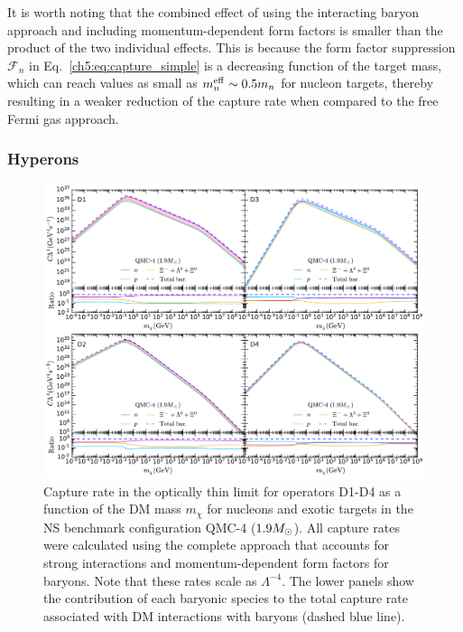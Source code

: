It is worth noting that the combined effect of using the interacting baryon approach and including momentum-dependent form factors is smaller than the product of the two individual effects. This is because the form factor suppression $\mathcal{F}_n$ in Eq.~\ref{ch5:eq:capture_simple} is a decreasing function of the target mass, which can reach values as small as $m_n^{\rm eff}\sim0.5m_n$ for nucleon targets, thereby resulting in a weaker reduction of the capture rate when compared to the free Fermi gas approach. 





\subsubsection{Hyperons}
\label{sec:capresexotic}

\begin{figure}[t!bp] 
\centering
\includegraphics[width=\textwidth]{capture_3/D1_D4_C_mDM_hyper_meff_ratio.pdf}
\caption{Capture rate in the optically thin limit for operators D1-D4 as a function of the DM mass $m_\chi$ for nucleons and exotic targets in the NS benchmark configuration QMC-4 ($1.9M_\odot$). All capture rates were calculated using the complete approach that accounts for strong interactions and momentum-dependent form factors for baryons. Note that these rates scale as $\Lambda^{-4}$. The lower panels show the contribution of each baryonic species to the total capture rate associated with DM interactions with baryons (dashed blue line). 
}
\label{ch5:fig:capratesD1D4_Hyper}
\end{figure}  



